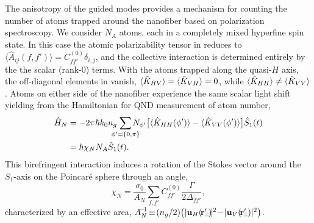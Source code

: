 \documentclass[aps,pra,twocolumn]{revtex4-1} %
\newcommand{\polcomp}{\hat{K}} %
\newcommand{\chiN}{\chi_{N}}
\newcommand{\Abir}{A_N}
\begin{document}
The anisotropy of the guided modes provides a mechanism for counting the number of atoms trapped around the nanofiber based on polarization spectroscopy.  
We consider $N_A$ atoms, each in a completely mixed hyperfine spin state. In this case the atomic polarizability tensor in  reduces to $\langle \hat{A}_{ij}(f,f') \rangle = C_{ff'}^{(0)} \delta_{i,j}$, and the collective interaction is determined entirely by the the scalar (rank-0) terms.  
With the atoms trapped along the quasi-$H$ axis, the off-diagonal elements in  vanish, $\expt{ \polcomp_{HV} } = \expt{ \polcomp_{VH} } =0$, while $\expt{ \polcomp_{HH} } \neq  \expt{ \polcomp_{VV} }$.  
Atoms on either side of the nanofiber experience the same scalar light shift yielding from   the Hamiltonian for QND measurement of atom number,
	\begin{align}
		\hat{H}_{N} &= -2\pi \hbar k_0 n_g \!\!\!\!\!\sum_{\phi' = \{0,\pi \}}\!\!\!\!\!\! N_{\phi'} \big[ \expt{ \polcomp_{HH}(\phi')}  - \expt{ \polcomp_{VV}(\phi')} \big] \hat{S}_1(t)  \nonumber \\
		& =  \hbar \chiN N_A \hat{S}_1(t).  \label{Eq::MixedHamiltonian}
	\end{align}	
This birefringent interaction induces a rotation of the Stokes vector  around the $S_1$-axis on the Poincar\'{e} sphere through an angle, 
	\begin{equation} \label{Eq::RotationAngle}
		\chiN = \frac{\sigma_0}{\Abir}  \sum_{f,f'}  C_{ff'}^{(0)} \frac{\Gamma}{2 \Delta_{ff'}},
	\end{equation}
characterized by an effective area, $\Abir^{\!-\!1} \!\equiv\! (n_g/2) \big( |\mathbf{u}_{H}(\!\br'\!\!_\perp\!)\!|^2 \!-\! |\mathbf{u}_{V}(\!\br'\!\!_\perp\!)| ^2 \big)$.   
\end{document}
